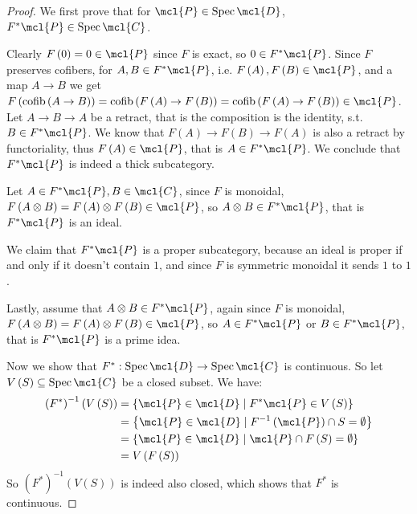 \begin{proof}
	We first prove that for $\mcl{P} \in \spec \mcl{D}$, $F^*\mcl{P} \in \spec \mcl{C}$.
	
	Clearly $F\left(0\right) = 0 \in \mcl{P}$ since $F$ is exact, so $0 \in F^*\mcl{P}$.
	Since $F$ preserves cofibers, for $A,B \in F^*\mcl{P}$, i.e. $F\left(A\right), F\left(B\right) \in \mcl{P}$, and a map $A \to B$ we get
	$
	F\left(\cofib\left(A \to B\right)\right)
	= \cofib\left(F\left(A\right) \to F\left(B\right)\right)
	= \cofib\left(F\left(A\right) \to F\left(B\right)\right)
	\in \mcl{P}
	$.
	Let $A \to B \to A$ be a retract, that is the composition is the identity, s.t. $B \in F^*\mcl{P}$. We know that $F\left(A\right) \to F\left(B\right) \to F\left(A\right)$ is also a retract by functoriality, thus $F\left(A\right) \in \mcl{P}$, that is $A \in F^*\mcl{P}$.
	We conclude that $F^*\mcl{P}$ is indeed a thick subcategory.
	
	Let $A \in F^*\mcl{P}, B \in \mcl{C}$, since $F$ is monoidal, $F\left(A \otimes B\right) = F\left(A\right) \otimes F\left(B\right) \in \mcl{P}$, so $A \otimes B \in F^*\mcl{P}$, that is $F^*\mcl{P}$ is an ideal.
	
	We claim that $F^*\mcl{P}$ is a proper subcategory, because an ideal is proper if and only if it doesn't contain $1$, and since $F$ is symmetric monoidal it sends $1$ to $1$.
	
	Lastly, assume that $A \otimes B \in F^*\mcl{P}$, again since $F$ is monoidal, $F\left(A \otimes B\right) = F\left(A\right) \otimes F\left(B\right) \in \mcl{P}$, so $A \in F^*\mcl{P}$ or $B \in F^*\mcl{P}$, that is $F^*\mcl{P}$ is a prime idea.
	
	Now we show that $F^*: \spec \mcl{D} \to \spec \mcl{C}$ is continuous.
	So let $V\left(S\right) \subseteq \spec \mcl{C}$ be a closed subset.
	We have:
	\begin{align*}
		\left(F^*\right)^{-1}\left(V\left(S\right)\right)
		&= \left\{ \mcl{P} \in \mcl{D} \mid F^*\mcl{P} \in V\left(S\right) \right\}\\
		&= \left\{ \mcl{P} \in \mcl{D} \mid F^{-1}\left(\mcl{P}\right) \cap S = \emptyset \right\}\\
		&= \left\{ \mcl{P} \in \mcl{D} \mid \mcl{P} \cap F\left(S\right) = \emptyset \right\}\\
		&= V\left(F\left(S\right)\right)
	\end{align*}
	So $\left(F^*\right)^{-1}\left(V\left(S\right)\right)$ is indeed also closed, which shows that $F^*$ is continuous.
\end{proof}

